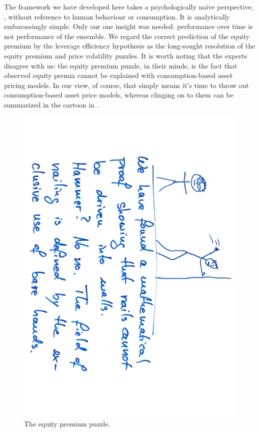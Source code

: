 The framework we have developed here takes a psychologically na\"{i}ve perspective, , without reference to human behaviour or consumption.
It is analytically embarassingly simple. Only our one insight was needed: performance over time is not performance of the ensemble. 
We regard the correct prediction of the equity premium by the leverage efficiency hypothesis as the long-sought resolution of the equity premium and price volatility puzzles. It is worth noting that the experts disagree with us: the equity premium puzzle, in their minds, is the fact that observed equity premia cannot be explained with consumption-based asset pricing models. In our view, of course, that simply means it's time to throw out consumption-based asset price models, whereas clinging on to them can be summarized in the cartoon in .
\begin{figure}
\centering
\includegraphics[width=\textwidth]{./chapter_4/figs/cartoon.pdf}
\caption{The equity premium puzzle.}
\end{figure}


